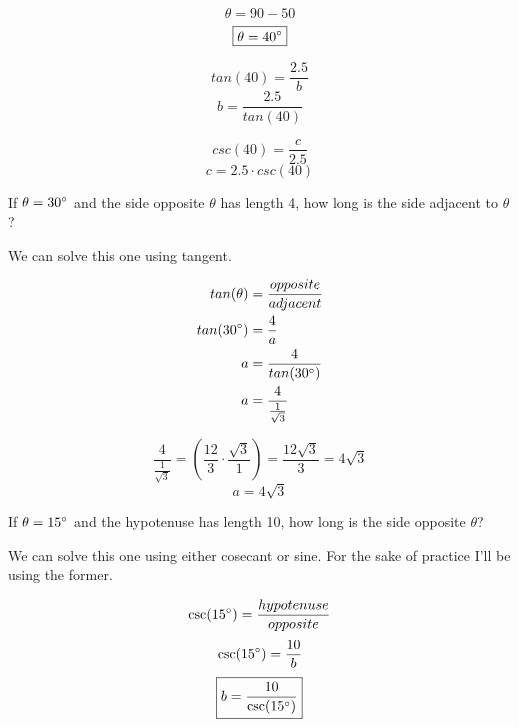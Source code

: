 \documentclass[10pt,letterpaper]{amspset}
\begin{document}
\begin{solution}

\[\theta = 90 - 50\]
\[\boxed{\theta = 40\degree}\]

\[tan(40) = \frac{2.5}{b}\]
\[\boxed{b = \frac{2.5}{tan(40)}}\]

\[csc(40) = \frac{c}{2.5}\]
\[\boxed{c = 2.5 \cdot csc(40)}\]

\end{solution}




\begin{problem}[70]
If $\theta = 30\degree$ and the side opposite $\theta$ has length 4, how long is the side adjacent to $\theta$?
\end{problem}

\begin{solution}[Solution]
We can solve this one using tangent. 


\begin{align}
    tan(\theta) &= \frac{opposite}{adjacent} \\
    tan(30\degree) &= \frac{4}{a} \\
    a &= \frac{4}{tan(30\degree)} \\
    a &= \frac{4}{\frac{1}{\sqrt{3}}}
\end{align}

\[\frac{4}{\frac{1}{\sqrt{3}}} = \left( \frac{12}{3} \cdot \frac{\sqrt{3}}{1} \right) = \frac{12 \sqrt{3}}{3} = 4\sqrt{3}\]
\[\boxed{a = 4\sqrt{3}}\]

\end{solution}


\pagebreak


\begin{problem}[71]
If $\theta = 15\degree$ and the hypotenuse has length 10, how long is the side opposite $\theta$?
\end{problem}

\begin{solution}[Solution]
We can solve this one using either cosecant or sine. For the sake of practice I'll be using the former. 

\[\csc(15\degree) = \frac{hypotenuse}{opposite}\]
\[\csc(15\degree) = \frac{10}{b}\]
\[\boxed{b = \frac{10}{\csc(15\degree)}}\]
\end{solution}
\end{document}
